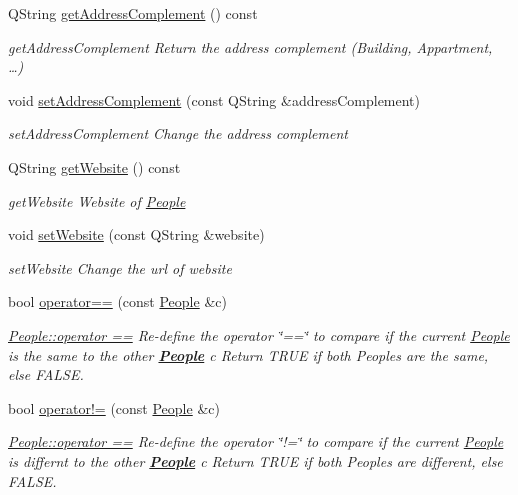 \begin{DoxyCompactItemize}
Q\+String \hyperlink{classModels_1_1People_ac57d89dcc2a06aabdfb37694183d68f0}{get\+Address\+Complement} () const 
\begin{DoxyCompactList}\small\item\em get\+Address\+Complement Return the address complement (Building, Appartment, …) \end{DoxyCompactList}\item 
void \hyperlink{classModels_1_1People_ad8dd15780dad1af2ab2a436bab8c4b58}{set\+Address\+Complement} (const Q\+String \&address\+Complement)
\begin{DoxyCompactList}\small\item\em set\+Address\+Complement Change the address complement \end{DoxyCompactList}\item 
Q\+String \hyperlink{classModels_1_1People_a898d32c40d89376bd7e8373e2f07a056}{get\+Website} () const 
\begin{DoxyCompactList}\small\item\em get\+Website Website of \hyperlink{classModels_1_1People}{People} \end{DoxyCompactList}\item 
void \hyperlink{classModels_1_1People_acd66787d72c4b69a04d0ce228260b784}{set\+Website} (const Q\+String \&website)
\begin{DoxyCompactList}\small\item\em set\+Website Change the url of website \end{DoxyCompactList}\item 
bool \hyperlink{classModels_1_1People_a1c875989cffc3119ff1f263c7898bbdb}{operator==} (const \hyperlink{classModels_1_1People}{People} \&c)
\begin{DoxyCompactList}\small\item\em \hyperlink{classModels_1_1People_a1c875989cffc3119ff1f263c7898bbdb}{People\+::operator ==} Re-\/define the operator \char`\"{}==\char`\"{} to compare if the current \hyperlink{classModels_1_1People}{People} is the same to the other {\bfseries \hyperlink{classModels_1_1People}{People}} {\itshape c} Return T\+R\+U\+E if both Peoples are the same, else F\+A\+L\+S\+E. \end{DoxyCompactList}\item 
bool \hyperlink{classModels_1_1People_afcc4f66db1e1b1deefb849fffe82d616}{operator!=} (const \hyperlink{classModels_1_1People}{People} \&c)
\begin{DoxyCompactList}\small\item\em \hyperlink{classModels_1_1People_a1c875989cffc3119ff1f263c7898bbdb}{People\+::operator ==} Re-\/define the operator \char`\"{}!=\char`\"{} to compare if the current \hyperlink{classModels_1_1People}{People} is differnt to the other {\bfseries \hyperlink{classModels_1_1People}{People}} {\itshape c} Return T\+R\+U\+E if both Peoples are different, else F\+A\+L\+S\+E. \end{DoxyCompactList}\end{DoxyCompactItemize}


